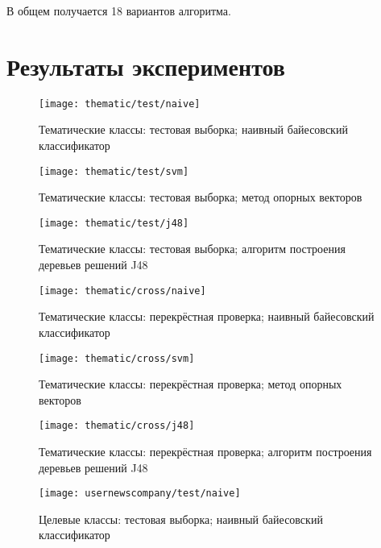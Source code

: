 В общем получается 18 вариантов алгоритма.

\section{Результаты экспериментов}

\begin{figure}[h!]
  \centering
    \texttt{[image: thematic/test/naive]}
    \caption{Тематические классы: тестовая выборка; наивный байесовский классификатор}
    \label{fig:thematic-test-naive}
\end{figure}

\begin{figure}[h!]
  \centering
    \texttt{[image: thematic/test/svm]}
    \caption{Тематические классы: тестовая выборка; метод опорных векторов}
    \label{fig:thematic-test-svm}
\end{figure}

\begin{figure}[h!]
  \centering
    \texttt{[image: thematic/test/j48]}
    \caption{Тематические классы: тестовая выборка; алгоритм построения деревьев решений J48}
    \label{fig:thematic-test-j48}
\end{figure}

\begin{figure}[h!]
  \centering
    \texttt{[image: thematic/cross/naive]}
    \caption{Тематические классы: перекрёстная проверка; наивный байесовский классификатор}
    \label{fig:thematic-cross-naive}
\end{figure}

\begin{figure}[h!]
  \centering
    \texttt{[image: thematic/cross/svm]}
    \caption{Тематические классы: перекрёстная проверка; метод опорных векторов}
    \label{fig:thematic-cross-svm}
\end{figure}

\begin{figure}[h!]
  \centering
    \texttt{[image: thematic/cross/j48]}
    \caption{Тематические классы: перекрёстная проверка; алгоритм построения деревьев решений J48}
    \label{fig:thematic-cross-j48}
\end{figure}

\begin{figure}[h!]
  \centering
    \texttt{[image: usernewscompany/test/naive]}
    \caption{Целевые классы: тестовая выборка; наивный байесовский классификатор}
    \label{fig:usernewscompany-test-naive}
\end{figure}

